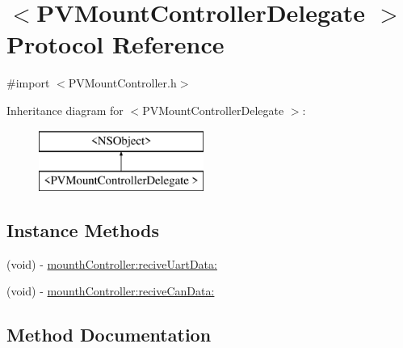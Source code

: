 \hypertarget{protocol_p_v_mount_controller_delegate_01-p}{}\section{$<$P\+V\+Mount\+Controller\+Delegate $>$ Protocol Reference}
\label{protocol_p_v_mount_controller_delegate_01-p}


{\ttfamily \#import $<$P\+V\+Mount\+Controller.\+h$>$}

Inheritance diagram for $<$P\+V\+Mount\+Controller\+Delegate $>$\+:\begin{figure}[H]
\begin{center}
\leavevmode
\includegraphics[height=2.000000cm]{protocol_p_v_mount_controller_delegate_01-p}
\end{center}
\end{figure}
\subsection*{Instance Methods}
\begin{DoxyCompactItemize}
\item 
(void) -\/ \hyperlink{protocol_p_v_mount_controller_delegate_01-p_a9edf0f9eeda44921e371e48a2937c52c}{mounth\+Controller\+:recive\+Uart\+Data\+:}
\item 
(void) -\/ \hyperlink{protocol_p_v_mount_controller_delegate_01-p_a988b797decba95445ce0979e410551e9}{mounth\+Controller\+:recive\+Can\+Data\+:}
\end{DoxyCompactItemize}


\subsection{Method Documentation}
\mbox{\label{protocol_p_v_mount_controller_delegate_01-p_a988b797decba95445ce0979e410551e9}} 
